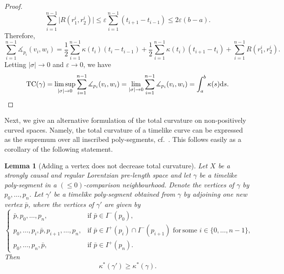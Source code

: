 \documentclass[hidelinks,12pt,a4paper]{article}
\numberwithin{equation}{section}
\theoremstyle{plain}
\newtheorem{lemma}[definition]{Lemma}
\theoremstyle{definition}
\newcommand{\eps}{\varepsilon}
\newcommand{\ma}{\ensuremath{\measuredangle}}
\newcommand{\diff}{\ensuremath{\mathrm{d}}}
\begin{document}
\begin{proof}
\begin{equation*}
\sum_{i=1}^{n-1}\big|R(r^i_1,r^i_2)\big|
\leq \eps\sum_{i=1}^{n-1}(t_{i+1}-t_{i-1})
\leq 2\eps(b-a).
\end{equation*}
Therefore,
\begin{equation*}
\sum_{i=1}^{n-1}\ma_{p_i}(v_i, w_i)
=
\frac{1}{2}\sum_{i=1}^{n-1}\kappa(t_i)(t_i-t_{i-1})
+\frac{1}{2}\sum_{i=1}^{n-1}\kappa(t_i)(t_{i+1}-t_i)
+\sum_{i=1}^{n-1}R(r^i_1,r^i_2).
\end{equation*}
Letting $|\sigma|\to 0$ and $\eps\to 0$, we have
\begin{equation*}
\mathrm {TC}(\gamma)=\limsup_{|\sigma|\rightarrow 0} \sum_{i=1}^{n-1}\ma_{p_i}(v_i, w_i)
=\lim_{|\sigma|\rightarrow 0} \sum_{i=1}^{n-1}\ma_{p_i}(v_i, w_i)
=\int_a^b \kappa(s)\diff s. \qedhere
\end{equation*}
\end{proof}

Next, we give an alternative formulation of the total curvature on non-positively curved spaces. 
Namely, the total curvature of a timelike curve can be expressed as the supremum over all inscribed poly-segments, cf.\ \cite[Theorem 4.5]{LMM2010}. 
This follows easily as a corollary of the following statement. 

\begin{lemma}[Adding a vertex does not decrease total curvature]
\label{lem: TCpoly}
Let $X$ be a strongly causal and regular Lorentzian pre-length space and let $\gamma$ be a timelike poly-segment in a $(\leq 0)$-comparison neighbourhood. 
Denote the vertices of $\gamma$ by $p_0,\dots,p_n$. 
Let $\gamma'$ be a timelike poly-segment obtained from $\gamma$ by adjoining one new vertex $\bar{p}$, where the vertices of $\gamma'$ are given by
\[
\begin{cases}
\bar{p},p_0,\dots,p_n, & \mathrm{if }\,\, \bar{p}\in I^-(p_0),\\
p_0,\dots,p_i,\bar{p},p_{i+1},\dots,p_n, & \mathrm{if }\,\, \bar{p}\in I^+(p_i)\cap I^-(p_{i+1})\, \,\mathrm{ for\, some }\, \,i\in\{0,\dots,n-1\},\\
p_0,\dots,p_n,\bar{p}, & \mathrm{if }\, \,\bar{p}\in I^+(p_n).
\end{cases}
\]
Then
\begin{equation*}
\kappa^*(\gamma')\geq \kappa^*(\gamma).
\end{equation*}
\end{lemma}
\end{document}
